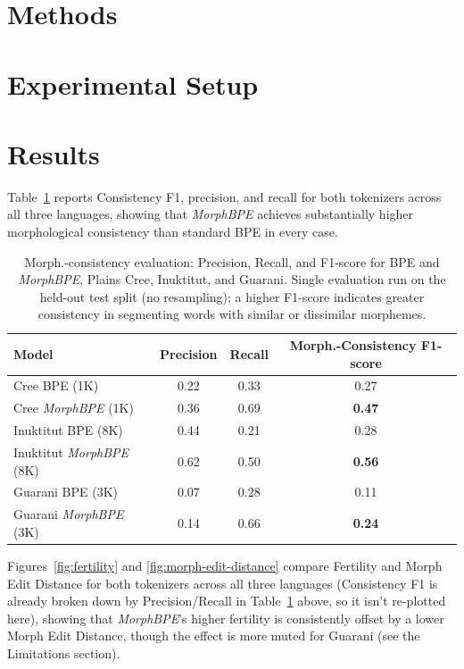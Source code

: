 \documentclass[11pt]{article}
\begin{document}
\section{Methods}

\section{Experimental Setup}

\section{Results}

Table~\ref{tab:consistency} reports Consistency F1, precision, and recall for both tokenizers across all three languages, showing that \textit{MorphBPE} achieves substantially higher morphological consistency than standard BPE in every case.

\begin{table}[t]
\centering
\begin{tabular}{lccc}
\toprule
Model & Precision & Recall & Morph.-Consistency F1-score \\
\midrule
Cree BPE (1K)                    & 0.22 & 0.33 & 0.27 \\
Cree \textit{MorphBPE} (1K)      & 0.36 & 0.69 & \textbf{0.47} \\
\addlinespace
Inuktitut BPE (8K)               & 0.44 & 0.21 & 0.28 \\
Inuktitut \textit{MorphBPE} (8K) & 0.62 & 0.50 & \textbf{0.56} \\
\addlinespace
Guarani BPE (3K)                 & 0.07 & 0.28 & 0.11 \\
Guarani \textit{MorphBPE} (3K)   & 0.14 & 0.66 & \textbf{0.24} \\
\bottomrule
\end{tabular}
\caption{Morph.-consistency evaluation: Precision, Recall, and F1-score for BPE and \textit{MorphBPE}, Plains Cree, Inuktitut, and Guarani. Single evaluation run on the held-out test split (no resampling); a higher F1-score indicates greater consistency in segmenting words with similar or dissimilar morphemes.}
\label{tab:consistency}
\end{table}

Figures~\ref{fig:fertility} and \ref{fig:morph-edit-distance} compare Fertility and Morph Edit Distance for both tokenizers across all three languages (Consistency F1 is already broken down by Precision/Recall in Table~\ref{tab:consistency} above, so it isn't re-plotted here), showing that \textit{MorphBPE}'s higher fertility is consistently offset by a lower Morph Edit Distance, though the effect is more muted for Guarani (see the Limitations section).
\end{document}
